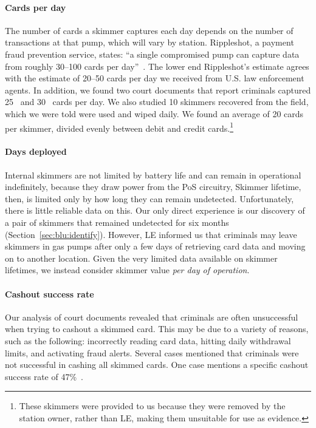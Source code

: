 \paragraph{Cards per day} The number of cards a skimmer captures each day
depends on the number of transactions at that pump, which will vary by station.
Rippleshot, a payment fraud prevention service, states: ``a single compromised
pump can capture data from roughly 30--100 cards per day''~\cite{rippleshot}.
The lower end Rippleshot's estimate agrees with the estimate of 20--50 cards
per day we received from U.S. law enforcement agents. In addition, we found two
court documents that report criminals captured 25~\cite{estrada} and
30~\cite{alisuretove} cards per day.
%
We also studied 10 skimmers recovered from the field, which we were told were used and wiped daily. We found an average of 20 cards per skimmer, divided
evenly between debit and credit cards.\footnote{These skimmers were provided to
us because they were removed by the station owner, rather than LE, making them
unsuitable for use as evidence.}

\paragraph{Days deployed}  Internal skimmers are not limited by battery life
and can remain in operational indefinitely, because they draw power from the
PoS circuitry, Skimmer lifetime, then, is limited only by how long they can
remain undetected. Unfortunately, there is little reliable data on this. Our
only direct experience is our discovery of a pair of skimmers that remained
undetected for six months (Section~\ref{sec:blu:identify}). However, LE
informed us that criminals may leave skimmers in gas pumps after only a few days of retrieving 
card data and moving on to another location. Given the very limited data available on
skimmer lifetimes, we instead consider skimmer value \emph{per day of
operation}.

\paragraph{Cashout success rate}

Our analysis of court documents revealed that criminals are often unsuccessful
when trying to cashout a skimmed card. This may be due to a variety of reasons,
such as the following: incorrectly reading card data, hitting daily withdrawal
limits, and activating fraud alerts. Several cases mentioned that criminals
were not successful in cashing all skimmed cards. One case mentions a specific
cashout success rate of 47\%~\cite{mekhakian}.%

